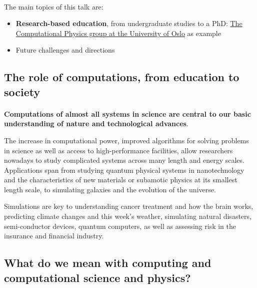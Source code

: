 \documentclass[%
oneside,                 %
final,                   %
10pt]{article}
\begin{document}
\paragraph{}
The main topics of this talk are:

\begin{itemize}
\item \textbf{Research-based education}, from undergraduate studies to a PhD: \href{{http://www.mn.uio.no/fysikk/english/research/groups/computational/index.html}}{The Computational Physics group at the University of Oslo} as example

\item Future challenges and directions
\end{itemize}

\noindent



\subsection*{The role of computations, from education to society}

\paragraph{}

\textbf{Computations of almost all systems in science are central to our
basic understanding of nature and technological advances}.

The increase in computational power,
improved algorithms for solving problems in science as well as access
to high-performance facilities, allow researchers nowadays to study
complicated systems across many length and energy scales. Applications
span from studying quantum physical systems in nanotechnology and the
characteristics of new materials or subamotic physics at its smallest
length scale, to simulating galaxies and the evolution of the universe.

Simulations are key to understanding
cancer treatment and how the brain works,
predicting climate changes and this week's weather,
simulating natural disasters, semi-conductor devices,
quantum computers, as well as assessing risk in the insurance and
financial industry.




\subsection*{What do we mean with computing and computational science and physics?}
\end{document}
